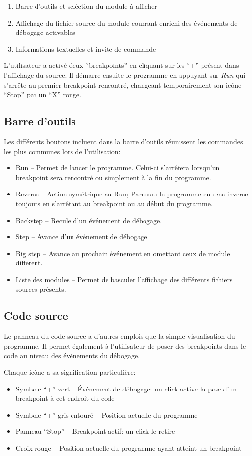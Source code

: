 \documentclass[11pt,a4paper]{report}
\begin{document}
\begin{enumerate}
\item Barre d'outils et séléction du module à afficher
\item Affichage du fichier source du module courrant enrichi des événements de débogage activables
\item Informations textuelles et invite de commande
\end{enumerate}

L'utilisateur a activé deux ``breakpoints'' en cliquant sur les ``+'' présent dans l'affichage du source.
Il démarre ensuite le programme en appuyant sur \emph{Run} qui s'arrête au premier breakpoint rencontré,
changeant temporairement son icône ``Stop'' par un ``X'' rouge.

\subsection{Barre d'outils}

Les différents boutons incluent dans la barre d'outils réunissent les commandes les plus communes lors de l'utilisation:
\begin{itemize}
\item Run -- Permet de lancer le programme. Celui-ci s'arrêtera lorsqu'un breakpoint sera rencontré ou simplement à la fin du programme.
\item Reverse -- Action symétrique au Run; Parcours le programme en sens inverse toujours en s'arrêtant au breakpoint ou au début du programme.
\item Backstep -- Recule d'un événement de débogage.
\item Step -- Avance d'un événement de débogage
\item Big step -- Avance au prochain événement en omettant ceux de module différent.
\item Liste des modules -- Permet de basculer l'affichage des différents fichiers sources présents.
\end{itemize}

\subsection{Code source}

Le panneau du code source a d'autres emplois que la simple visualisation du programme. 
Il permet également à l'utilisateur de poser des breakpoints dans le code au niveau des événements du débogage.

Chaque icône a sa signification particulière:
\begin{itemize}
\item Symbole ``+'' vert -- \'Evénement de débogage: un click active la pose d'un breakpoint à cet endroit du code
\item Symbole ``+'' gris entouré -- Position actuelle du programme
\item Panneau ``Stop'' -- Breakpoint actif: un click le retire
\item Croix rouge -- Position actuelle du programme ayant atteint un breakpoint
\end{itemize}
\end{document}
